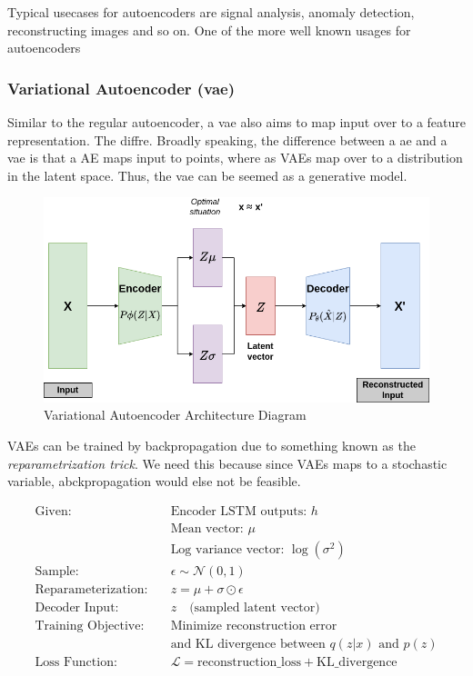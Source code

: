 Typical usecases for autoencoders are signal analysis, anomaly detection, reconstructing images and so on. 
One of the more well known usages for autoencoders

\subsubsection{Variational Autoencoder (\acrshort{vae})}

Similar to the regular autoencoder, a \acrfull{vae} also aims to map input over to a feature representation. The diffre. Broadly speaking, the difference between a \acrshort{ae} and a \acrshort{vae} is that a AE maps input to points, where as VAEs map over to a distribution in the latent space. Thus, the \acrlong{vae} can be seemed as a generative model.


\begin{figure}[h]
    \centering
    \includegraphics[scale=0.5]{figures/vae.png}
    \caption{Variational Autoencoder Architecture Diagram}
    \label{fig:vaediagram}
\end{figure}


VAEs can be trained by backpropagation due to something known as the \textit{reparametrization trick}. We need this because since VAEs maps to a stochastic variable, abckpropagation would else not be feasible.

\begin{align*}
\text{Given:} & \quad \text{Encoder LSTM outputs: } h \\
& \quad \text{Mean vector: } \mu \\
& \quad \text{Log variance vector: } \log(\sigma^2) \\
\text{Sample:} & \quad \epsilon \sim \mathcal{N}(0, 1) \\
\text{Reparameterization:} & \quad z = \mu + \sigma \odot \epsilon \\
\text{Decoder Input:} & \quad z \quad \text{(sampled latent vector)} \\
\text{Training Objective:} & \quad \text{Minimize reconstruction error} \\
& \quad \text{and KL divergence between } q(z|x) \text{ and } p(z) \\
\text{Loss Function:} & \quad \mathcal{L} = \text{reconstruction\_loss} + \text{KL\_divergence}
\end{align*}




